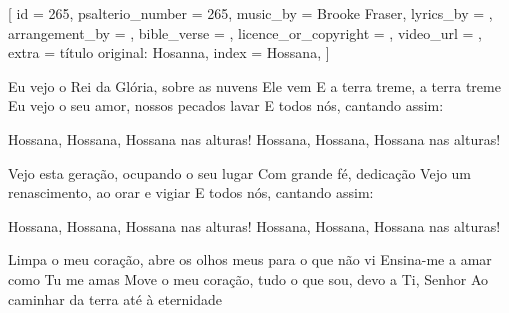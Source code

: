[
    id                     = {265},
    psalterio_number       = {265},
    music_by               = {Brooke Fraser},
    lyrics_by              = {},
    arrangement_by         = {},
    bible_verse            = {},
    licence_or_copyright   = {},
    video_url              = {},
    extra                  = {título original: Hosanna},
    index                  = {Hossana},
]


\beginverse
Eu vejo o Rei da Glória, sobre as nuvens Ele vem
E a terra treme, a terra treme
Eu vejo o seu amor, nossos pecados lavar
E todos nós, cantando assim:
\endverse


\beginchorus
Hossana, Hossana, Hossana nas alturas!
Hossana, Hossana, Hossana nas alturas!
\endchorus


\beginverse
Vejo esta geração, ocupando o seu lugar
Com grande fé, dedicação
Vejo um renascimento, ao orar e vigiar
E todos nós, cantando assim:
\endverse


\beginchorus
Hossana, Hossana, Hossana nas alturas!
Hossana, Hossana, Hossana nas alturas!
\endchorus


\beginverse
Limpa o meu coração, abre os olhos meus para o que não vi
Ensina-me a amar como Tu me amas
Move o meu coração, tudo o que sou, devo a Ti, Senhor
Ao caminhar da terra até à eternidade
\endverse

\endsong
